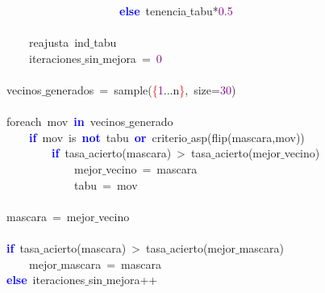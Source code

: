 \mbox{}\ \ \ \ \ \ \ \ \ \ \ \ \ \ \ \ \ \ \ \ \ \ \ \ \ \ \ \ \textbf{\textcolor{Blue}{else}}\ tenencia$\_$tabu\textcolor{BrickRed}{*}\textcolor{Purple}{0.5} \\
\mbox{} \\
\mbox{}\ \ \ \ \ \ \ \ \ \ \ \ reajusta\ ind$\_$tabu \\
\mbox{}\ \ \ \ \ \ \ \ \ \ \ \ iteraciones$\_$sin$\_$mejora\ \textcolor{BrickRed}{=}\ \textcolor{Purple}{0} \\
\mbox{} \\
\mbox{}\ \ \ \ \ \ \ \ vecinos$\_$generados\ \textcolor{BrickRed}{=}\ sample\textcolor{BrickRed}{(}\textcolor{Red}{\{}\textcolor{Purple}{1}\textcolor{BrickRed}{...}n\textcolor{Red}{\}}\textcolor{BrickRed}{,}\ size\textcolor{BrickRed}{=}\textcolor{Purple}{30}\textcolor{BrickRed}{)} \\
\mbox{} \\
\mbox{}\ \ \ \ \ \ \ \ foreach\ mov\ \textbf{\textcolor{Blue}{in}}\ vecinos$\_$generado \\
\mbox{}\ \ \ \ \ \ \ \ \ \ \ \ \textbf{\textcolor{Blue}{if}}\ mov\ is\ \textbf{\textcolor{Blue}{not}}\ tabu\ \textbf{\textcolor{Blue}{or}}\ criterio$\_$asp\textcolor{BrickRed}{(}flip\textcolor{BrickRed}{(}mascara\textcolor{BrickRed}{,}mov\textcolor{BrickRed}{))} \\
\mbox{}\ \ \ \ \ \ \ \ \ \ \ \ \ \ \ \ \textbf{\textcolor{Blue}{if}}\ tasa$\_$acierto\textcolor{BrickRed}{(}mascara\textcolor{BrickRed}{)}\ \textcolor{BrickRed}{\textgreater{}}\ tasa$\_$acierto\textcolor{BrickRed}{(}mejor$\_$vecino\textcolor{BrickRed}{)} \\
\mbox{}\ \ \ \ \ \ \ \ \ \ \ \ \ \ \ \ \ \ \ \ mejor$\_$vecino\ \textcolor{BrickRed}{=}\ mascara \\
\mbox{}\ \ \ \ \ \ \ \ \ \ \ \ \ \ \ \ \ \ \ \ tabu\ \textcolor{BrickRed}{=}\ mov \\
\mbox{} \\
\mbox{}\ \ \ \ \ \ \ \ mascara\ \textcolor{BrickRed}{=}\ mejor$\_$vecino \\
\mbox{} \\
\mbox{}\ \ \ \ \ \ \ \ \textbf{\textcolor{Blue}{if}}\ tasa$\_$acierto\textcolor{BrickRed}{(}mascara\textcolor{BrickRed}{)}\ \textcolor{BrickRed}{\textgreater{}}\ tasa$\_$acierto\textcolor{BrickRed}{(}mejor$\_$mascara\textcolor{BrickRed}{)} \\
\mbox{}\ \ \ \ \ \ \ \ \ \ \ \ mejor$\_$mascara\ \textcolor{BrickRed}{=}\ mascara \\
\mbox{}\ \ \ \ \ \ \ \ \textbf{\textcolor{Blue}{else}}\ iteraciones$\_$sin$\_$mejora\textcolor{BrickRed}{++} \\
